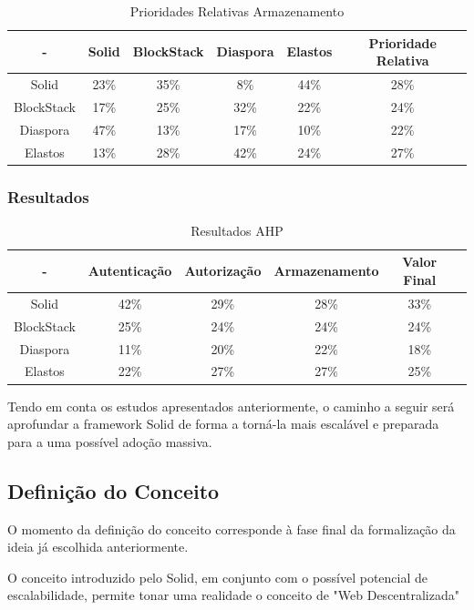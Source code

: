 \begin{table}[h]
\centering
\caption{Prioridades Relativas Armazenamento}
\vspace{0.5cm}
\begin{tabular}{c|c|c|c|c|c} 
 - & Solid & BlockStack & Diaspora & Elastos & Prioridade Relativa \\
\hline                               
Solid & 23\% & 35\% & 8\% & 44\% & 28\% \\
BlockStack &  17\% & 25\%	& 32\%	& 22\%	& 24\% \\
Diaspora &  47\% &	13\% & 17\%	& 10\% & 22\% \\
Elastos & 13\% & 28\% & 42\% & 24\% & 27\% \\
\end{tabular}
\label{tab:ex_map}
\end{table}

\subsubsection{Resultados}

\begin{table}[h]
\centering
\caption{Resultados AHP}
\vspace{0.5cm}
\begin{tabular}{c|c|c|c|c|c} 
 - & Autenticação & Autorização & Armazenamento & Valor Final & \\
\hline                               
Solid & 42\% &	29\% & 28\%	& 33\% & \\
BlockStack &  25\% & 24\% & 24\% & 24\% & \\
Diaspora &  11\% &	20\% & 22\% & 18\% & \\
Elastos & 22\% & 27\% & 27\% & 25\% & \\
\end{tabular}
\label{tab:ex_map}
\end{table}


Tendo em conta os estudos apresentados anteriormente, o caminho a seguir será aprofundar a framework Solid de forma a torná-la mais escalável e preparada para a uma possível adoção massiva.

\subsection{Definição do Conceito}
O momento da definição do conceito corresponde à fase final da formalização da ideia já escolhida anteriormente.

O conceito introduzido pelo Solid, em conjunto com o possível potencial de escalabilidade, permite tonar uma realidade o conceito de "Web Descentralizada"

